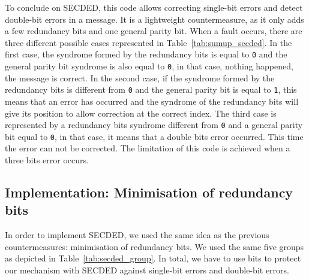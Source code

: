 To conclude on SECDED, this code allows correcting single-bit errors and detect double-bit errors in a message. It is a lightweight countermeasure, as it only adds a few redundancy bits and one general parity bit. When a fault occurs, there are three different possible cases represented in Table~\ref{tab:sumup_secded}. In the first case, the syndrome formed by the redundancy bits is equal to \texttt{0} and the general parity bit syndrome is also equal to \texttt{0}, in that case, nothing happened, the message is correct.
In the second case, if the syndrome formed by the redundancy bits is different from \texttt{0} and the general parity bit is equal to \texttt{1}, this means that an error has occurred and the syndrome of the redundancy bits will give its position to allow correction at the correct index.
The third case is represented by a redundancy bits syndrome different from \texttt{0} and a general parity bit equal to \texttt{0}, in that case, it means that a double bits error occurred. This time the error can not be corrected. The limitation of this code is achieved when a three bits error occurs.

\subsection{Implementation: Minimisation of redundancy bits}

In order to implement SECDED, we used the same idea as the previous countermeasures: minimisation of redundancy bits. We used the same five groups as depicted in Table~\ref{tab:secded_group}. In total, we have to use  bits to protect our mechanism with SECDED against single-bit errors and double-bit errors.

